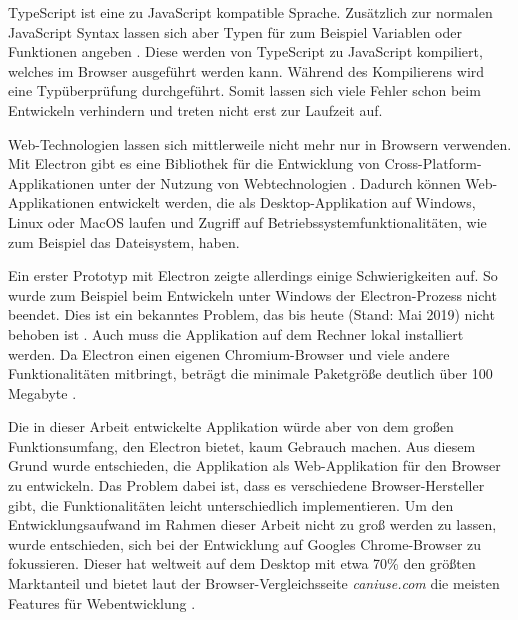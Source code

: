TypeScript ist eine zu JavaScript kompatible Sprache. Zusätzlich zur normalen JavaScript Syntax lassen sich aber Typen für zum Beispiel Variablen oder Funktionen angeben \cite{typescript:mainpage}. Diese werden von TypeScript zu JavaScript kompiliert, welches im Browser ausgeführt werden kann. Während des Kompilierens wird eine Typüberprüfung durchgeführt. Somit lassen sich viele Fehler schon beim Entwickeln verhindern und treten nicht erst zur Laufzeit auf.

Web-Technologien lassen sich mittlerweile nicht mehr nur in Browsern verwenden. Mit Electron gibt es eine Bibliothek für die Entwicklung von Cross-Platform-Applikationen unter der Nutzung von Webtechnologien \cite{electron:about}. Dadurch können Web-Applikationen entwickelt werden, die als Desktop-Applikation auf Windows, Linux oder MacOS laufen und Zugriff auf Betriebssystemfunktionalitäten, wie zum Beispiel das Dateisystem, haben.

Ein erster Prototyp mit Electron zeigte allerdings einige Schwierigkeiten auf. So wurde zum Beispiel beim Entwickeln unter Windows der Electron-Prozess nicht beendet. Dies ist ein bekanntes Problem, das bis heute (Stand: Mai 2019) nicht behoben ist \cite{electron:processissue}. Auch muss die Applikation auf dem Rechner lokal installiert werden. Da Electron einen eigenen Chromium-Browser und viele andere Funktionalitäten mitbringt, beträgt die minimale Paketgröße deutlich über 100 Megabyte \cite{electron:sizeissue}.

Die in dieser Arbeit entwickelte Applikation würde aber von dem großen Funktionsumfang, den Electron bietet, kaum Gebrauch machen. Aus diesem Grund wurde entschieden, die Applikation als Web-Applikation für den Browser zu entwickeln. Das Problem dabei ist, dass es verschiedene Browser-Hersteller gibt, die Funktionalitäten leicht unterschiedlich implementieren. Um den Entwicklungsaufwand im Rahmen dieser Arbeit nicht zu groß werden zu lassen, wurde entschieden, sich bei der Entwicklung auf Googles Chrome-Browser zu fokussieren. Dieser hat weltweit auf dem Desktop mit etwa 70\% den größten Marktanteil \cite{statcounter:desktopbrowser} und bietet laut der Browser-Vergleichsseite \textit{caniuse.com} die meisten Features für Webentwicklung \cite{caniuse:home}.